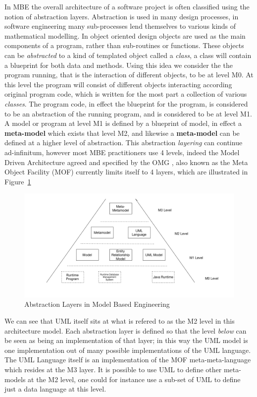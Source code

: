 \documentclass{llncs}
\begin{document}
In MBE the overall architecture of a software project is often classified using the notion of abstraction layers. Abstraction is used in many design processes, in software engineering many sub-processes lend themselves to various kinds of mathematical modelling.  In object oriented design objects are used as the main components of a program, rather than sub-routines or functions.  These objects can be \emph{abstracted} to a kind of templated object called a \emph{class}, a class will contain a blueprint for both data and methods.  Using this idea we consider the the program running, that is the interaction of different objects, to be at level M0.  At this level the program will consist of different objects interacting according original program code, which is written for the most part a collection of various \emph{classes}.  The program code, in effect the blueprint for the program, is considered to be an abstraction of the running program, and is considered to be at level M1.  A model or program at level M1 is defined by a blueprint of model, in effect a \textbf{meta-model} which exists that level M2, and likewise a \textbf{meta-model} can be defined at a higher level of abstraction.  This abstraction \emph{layering} can continue ad-infinitum, however most MBE practitioners use 4 levels, indeed the Model Driven Architecture agreed and specified by the OMG \cite{MOF242}, also known as the Meta Object Facility (MOF) currently limits itself to 4 layers, which are illustrated in Figure~\ref{fig:mbe1}

\begin{figure}[h]
\includegraphics[width=1.0\textwidth,natwidth=610,natheight=642]{Models1}
\caption{Abstraction Layers in Model Based Engineering} 
\label{fig:mbe1}
\end{figure}

We can see that UML itself sits at what is refered to as the M2 level in this architecture model. Each abstraction layer is defined so that the level \emph{below} can be seen as being an implementation of that layer; in this way the UML model is one implementation out of many possible implementations of the UML language. The UML Language itself is an implementation of the MOF meta-meta-language which resides at the M3 layer. It is possible to use UML to define other meta-models at the M2 level, one could for instance use a sub-set of UML to define just a data language at this level.
\end{document}
